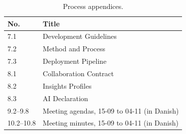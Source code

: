 \begin{table}[H]
    \centering
    \begin{tabular}{@{}l l@{}}
        \hline
        No. & Title \\
        \hline
        7.1 & Development Guidelines \\
        7.2 & Method and Process \\
        7.3 & Deployment Pipeline \\
        8.1 & Collaboration Contract \\
        8.2 & Insights Profiles \\
        8.3 & AI Declaration \\
        9.2--9.8 & Meeting agendas, 15-09 to 04-11 (in Danish) \\
        10.2--10.8 & Meeting minutes, 15-09 to 04-11 (in Danish) \\
        \hline
    \end{tabular}
    \caption{Process appendices.}
    \label{tab:appendix-process}
\end{table}
